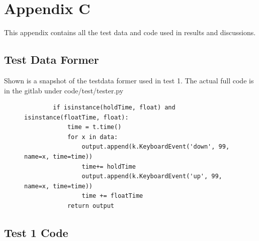 \documentclass[10pt,a4paper]{report}
\begin{document}
\chapter*{Appendix C}

This appendix contains all the test data and code used in results and discussions.

\section*{Test Data Former}

Shown is a snapshot of the testdata former used in test 1. The actual full code is in the gitlab under code/test/tester.py
\begin{figure}
	\begin{lstlisting}
		if isinstance(holdTime, float) and isinstance(floatTime, float):
        	time = t.time()
        	for x in data:
            	output.append(k.KeyboardEvent('down', 99, name=x, time=time))
            	time+= holdTime
           	 	output.append(k.KeyboardEvent('up', 99, name=x, time=time))
            	time += floatTime
        	return output
     \end{lstlisting}
\end{figure}

\section*{Test 1 Code}
\end{document}
